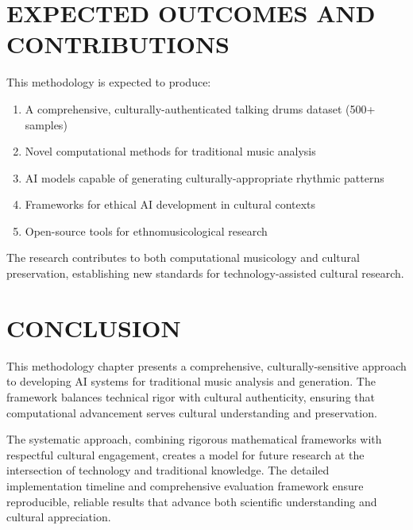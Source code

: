 \documentclass[12pt,a4paper]{article}
\begin{document}
\section{EXPECTED OUTCOMES AND CONTRIBUTIONS}

This methodology is expected to produce:

\begin{enumerate}
\item A comprehensive, culturally-authenticated talking drums dataset (500+ samples)
\item Novel computational methods for traditional music analysis
\item AI models capable of generating culturally-appropriate rhythmic patterns
\item Frameworks for ethical AI development in cultural contexts
\item Open-source tools for ethnomusicological research
\end{enumerate}

The research contributes to both computational musicology and cultural preservation, establishing new standards for technology-assisted cultural research.

\section{CONCLUSION}

This methodology chapter presents a comprehensive, culturally-sensitive approach to developing AI systems for traditional music analysis and generation. The framework balances technical rigor with cultural authenticity, ensuring that computational advancement serves cultural understanding and preservation.

The systematic approach, combining rigorous mathematical frameworks with respectful cultural engagement, creates a model for future research at the intersection of technology and traditional knowledge. The detailed implementation timeline and comprehensive evaluation framework ensure reproducible, reliable results that advance both scientific understanding and cultural appreciation.

\newpage

\end{document}
